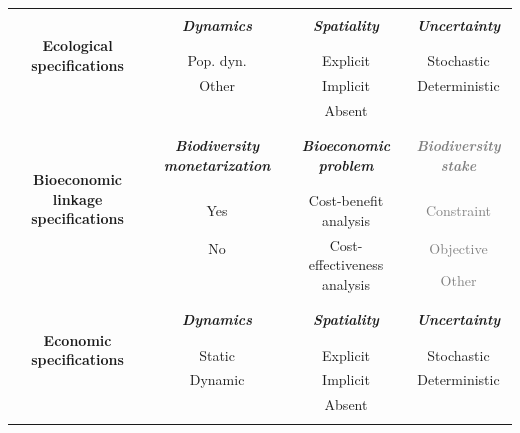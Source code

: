\begin{table}[H]
{\begin{tabular}{|c|c|c|c|}
   & & & \\
\hline \hline \hline
& & & \\
\multirow{5}{7em}{\textbf{Ecological specifications}} &   \textbf{\textit{Dynamics}} & \textbf{\textit{Spatiality}} & \textbf{\textit{Uncertainty}} \\
& & & \\
\cline{2-4} \noalign{\vskip\doublerulesep
         \vskip-\arrayrulewidth} \cline{2-4}
& & &\\
& Pop. dyn. & Explicit  & Stochastic \\
 &  Other  &   Implicit & Deterministic  \\
& & Absent &\\
& & & \\
\hline \hline \hline
& & & \\
\multirow{5}{7em}{\textbf{Bioeconomic linkage specifications}} & \textbf{\textit{Biodiversity monetarization}} &  \textbf{\textit{Bioeconomic problem}} &\textcolor{gray}{\textbf{\textit{Biodiversity stake}}} \\
& & & \\
\cline{2-4} \noalign{\vskip\doublerulesep
         \vskip-\arrayrulewidth} \cline{2-4}
& & &\\
&  Yes & Cost-benefit analysis & \textcolor{gray}{Constraint } \\
& No  &  \multirow{2}{8em}{Cost-effectiveness analysis} &\textcolor{gray}{Objective}   \\
& & &\textcolor{gray}{Other}  \\
& & & \\
 
\hline \hline \hline
& & & \\
\multirow{5}{7em}{\textbf{Economic specifications}}& \textbf{\textit{Dynamics}} &  \textbf{\textit{Spatiality}} & \textbf{\textit{Uncertainty}}\\
& & & \\
\cline{2-4} \noalign{\vskip\doublerulesep
         \vskip-\arrayrulewidth} \cline{2-4}
& & & \\
& Static &  Explicit  &  Stochastic \\
& Dynamic &  Implicit  & Deterministic \\
& &  Absent  & \\
& & & \\


\end{tabular}}
\end{table}
